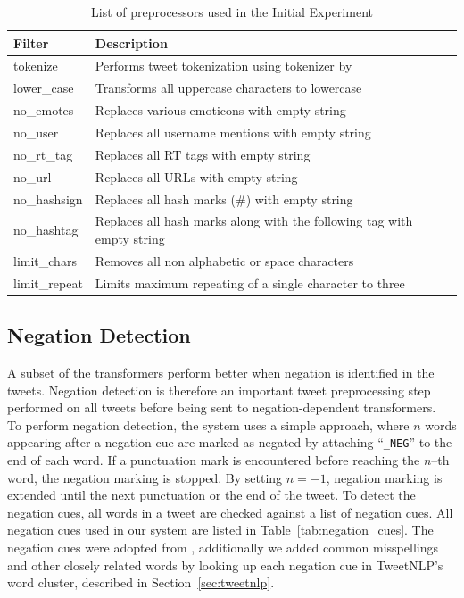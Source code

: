 \begin{table}[t]
    \centering
    \begin{tabular}{| l | p{9.3cm} |}
        \hline
        \textbf{Filter} & \textbf{Description} \\ \hline
        tokenize & Performs tweet tokenization using tokenizer by \cite{PottsTokenizer} \\ \hline
        lower\_case & Transforms all uppercase characters to lowercase \\ \hline
        no\_emotes & Replaces various emoticons with empty string \\ \hline
        no\_user & Replaces all username mentions with empty string \\ \hline
        no\_rt\_tag & Replaces all RT tags with empty string \\ \hline
        no\_url & Replaces all URLs with empty string \\ \hline
        no\_hashsign & Replaces all hash marks (\#) with empty string \\ \hline
        no\_hashtag & Replaces all hash marks along with the following tag with empty string \\ \hline
        limit\_chars & Removes all non alphabetic or space characters \\ \hline
        limit\_repeat & Limits maximum repeating of a single character to three \\ \hline
    \end{tabular}
    \caption{List of preprocessors used in the Initial Experiment}
    \label{tab:filters}
\end{table}

\subsection*{Negation Detection}
A subset of the transformers perform better when negation is identified in the tweets. Negation detection is therefore an important tweet preprocessing step performed on all tweets before being sent to negation-dependent transformers. \\

To perform negation detection, the system uses a simple approach, where $n$ words appearing after a negation cue are marked as negated by attaching ``\texttt{\_NEG}'' to the end of each word. If a punctuation mark is encountered before reaching the $n$--th word, the negation marking is stopped. By setting $n=-1$, negation marking is extended until the next punctuation or the end of the tweet. To detect the negation cues, all words in a tweet are checked against a list of negation cues. All negation cues used in our system are listed in Table~\ref{tab:negation_cues}. The negation cues were adopted from \cite{Councill10}, additionally we added common misspellings and other closely related words by looking up each negation cue in TweetNLP's word cluster, described in Section~\ref{sec:tweetnlp}.

